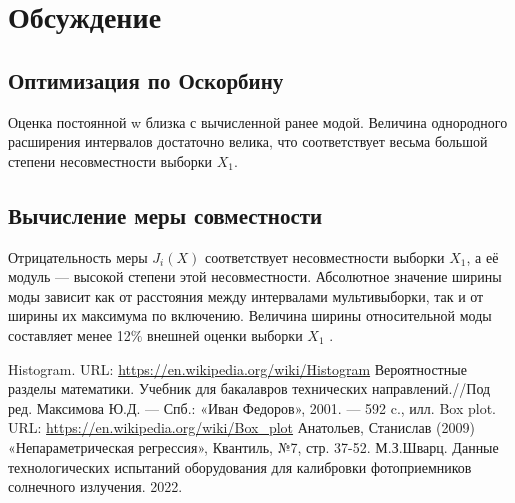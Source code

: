 \documentclass[a4paper,14pt]{article}
\begin{document}
	
	\section{Обсуждение}
	\subsection{Оптимизация по Оскорбину}
	Оценка постоянной w близка с вычисленной ранее модой. Величина однородного расширения интервалов достаточно велика, что соответствует весьма
	большой степени несовместности выборки $X_1$.
	
	\subsection{Вычисление меры совместности}
	Отрицательность меры $J_i(X)$ соответствует несовместности выборки $X_1$, а её
	модуль — высокой степени этой несовместности.
	Абсолютное значение ширины моды зависит как от расстояния между интервалами мультивыборки, так и от ширины их максимума по включению. Величина ширины относительной моды составляет менее 12$\%$ внешней оценки выборки
	$X_1$ .
	

	\newpage
	
	\begin{thebibliography}{4}
		Histogram. URL: \url{https://en.wikipedia.org/wiki/Histogram}
		Вероятностные разделы математики. Учебник для бакалавров технических направлений.//Под ред. Максимова Ю.Д. --- Спб.: «Иван Федоров», 2001. --- 592 c., илл.
		Box plot. URL: \url{https://en.wikipedia.org/wiki/Box_plot}
		Анатольев, Станислав (2009) «Непараметрическая регрессия», Квантиль, №7, стр. 37-52.
		 М.З.Шварц. Данные технологических испытаний оборудования для калибровки фотоприемников солнечного излучения. 2022.
	\end{thebibliography}
\end{document}

